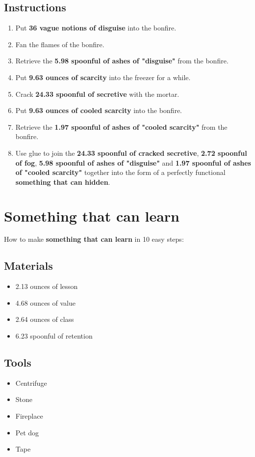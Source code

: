 \documentclass{article}
\begin{document}
\subsection{Instructions}\begin{enumerate}
\item 
Put \textbf{36 vague notions of disguise} into the bonfire.
\item 
Fan the flames of the bonfire.
\item 
Retrieve the \textbf{5.98 spoonful of ashes of "disguise"} from the bonfire.
\item 
Put \textbf{9.63 ounces of scarcity} into the freezer for a while.
\item 
Crack \textbf{24.33 spoonful of secretive} with the mortar.
\item 
Put \textbf{9.63 ounces of cooled scarcity} into the bonfire.
\item 
Retrieve the \textbf{1.97 spoonful of ashes of "cooled scarcity"} from the bonfire.
\item 
Use glue to join the \textbf{24.33 spoonful of cracked secretive}, \textbf{2.72 spoonful of fog}, \textbf{5.98 spoonful of ashes of "disguise"} and \textbf{1.97 spoonful of ashes of "cooled scarcity"} together into the form of a perfectly functional \textbf{something that can hidden}.
\end{enumerate}
\newpage
\section{Something that can learn}How to make \textbf{something that can learn} in 10 easy steps:

\subsection{Materials}\begin{itemize}
\item 
2.13 ounces of lesson
\item 
4.68 ounces of value
\item 
2.64 ounces of class
\item 
6.23 spoonful of retention
\end{itemize}
\subsection{Tools}\begin{itemize}
\item 
Centrifuge
\item 
Stone
\item 
Fireplace
\item 
Pet dog
\item 
Tape
\end{itemize}
\end{document}
